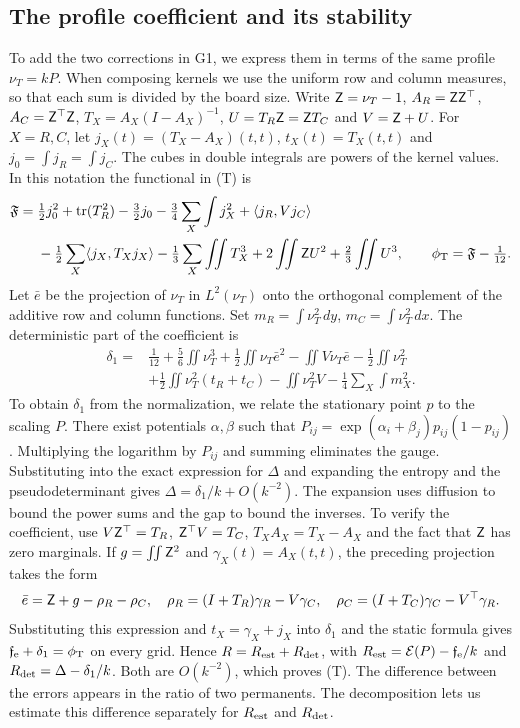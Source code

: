 \subsection{The profile coefficient and its stability}
To add the two corrections in G1, we express them in terms of the same profile $\nu_T=kP$. When
composing kernels we use the uniform row and column measures, so that each sum is divided by the
board size. Write $\mathsf Z=\nu_T-1$, $A_R=\mathsf Z\mathsf Z^\top$, $A_C=\mathsf Z^\top
\mathsf Z$, $T_X=A_X(I-A_X)^{-1}$, $U=T_R\mathsf Z=\mathsf Z{}T_C$ and $V=\mathsf Z+U$. For
$X=R,C$, let $j_X(t)=(T_X-A_X)(t,t)$, $t_X(t)=T_X(t,t)$ and $j_0=\int j_R=\int j_C$. The cubes in
double integrals are powers of the kernel values. In this notation the functional in (T) is
\begin{align*}
 \mathfrak F={}&\tfrac12j_0^2+\operatorname{tr}(T_R^2)-\tfrac32 j_0
    -\tfrac34\sum_X\int j_X^2+\langle j_R,V j_C\rangle\\
 &-\tfrac12\sum_X\langle j_X,T_Xj_X\rangle-\tfrac13\sum_X\iint T_X^3
    +2\iint \mathsf Z{}U^2+\tfrac23\iint U^3,\qquad
 \phi_{\mathrm T}=\mathfrak F-\tfrac1{12}.
\end{align*}
Let $\bar e$ be the projection of $\nu_T$ in $L^2(\nu_T)$ onto the orthogonal complement of the
additive row and column functions. Set $m_R=\int\nu_T^2\,dy$, $m_C=\int\nu_T^2\,dx$. The
deterministic part of the coefficient is
\begin{align*}
 \delta_1={}&\tfrac1{12}+\tfrac56\iint\nu_T^3+\tfrac12\iint\nu_T\bar e^2
 -\iint V\nu_T\bar e-\tfrac12\iint\nu_T^2\\
 &+\tfrac12\iint\nu_T^2(t_R+t_C)-\iint\nu_T^2V-\tfrac14\sum_X\int m_X^2 .
\end{align*}
To obtain $\delta_1$ from the normalization, we relate the stationary point $p$ to the scaling
$P$. There exist potentials $\alpha,\beta$ such that
$P_{ij}=\exp(\alpha_i+\beta_j)p_{ij}(1-p_{ij})$. Multiplying the logarithm by $P_{ij}$ and summing
eliminates the gauge. Substituting into the exact expression for $\Delta$ and expanding the
entropy and the pseudodeterminant gives $\Delta=\delta_1/k+O(k^{-2})$. The expansion uses
diffusion to bound the power sums and the gap to bound the inverses. To verify the coefficient,
use $V \mathsf Z^\top=T_R$, $\mathsf Z^\top V=T_C$, $T_X A_X=T_X-A_X$ and the fact that
$\mathsf Z$ has zero marginals. If $g=\iint \mathsf Z^2$ and $\gamma_X(t)=A_X(t,t)$, the preceding
projection takes the form
\[
 \bar e=\mathsf Z+g-\rho_R-\rho_C,\quad
 \rho_R=(I+T_R)\gamma_R-V\gamma_C,\quad
 \rho_C=(I+T_C)\gamma_C-V^\top\gamma_R .
\]
Substituting this expression and $t_X=\gamma_X+j_X$ into $\delta_1$ and the static formula gives
$\mathfrak f_{\rm e}+\delta_1=\phi_{\mathrm T}$ on every grid. Hence $R=R_{\rm est}+R_{\rm det}$, with
$R_{\rm est}=\mathcal E(P)-\mathfrak f_{\rm e}/k$ and $R_{\rm det}=\Delta-\delta_1/k$. Both are
$O(k^{-2})$, which proves (T). The difference between the errors appears in the ratio of two
permanents. The decomposition lets us estimate this difference separately for $R_{\rm est}$ and
$R_{\rm det}$.

